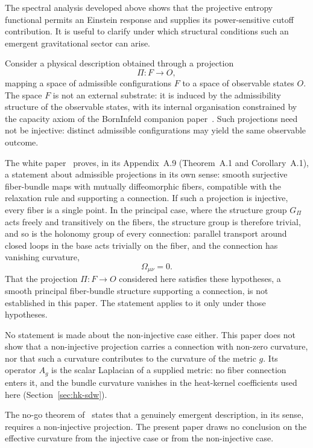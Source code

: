 \documentclass[pdflatex,sn-mathphys-num]{sn-jnl} %
\theoremstyle{remark}
\theoremstyle{plain}
\begin{document}
    The spectral analysis developed above shows that the projective entropy functional permits an Einstein response
    and supplies its power-sensitive cutoff contribution.
    It is useful to clarify under which structural conditions such an emergent
    gravitational sector can arise.

    Consider a physical description obtained through a projection
    \[
      \Pi : F \rightarrow O ,
    \]
    mapping a space of admissible configurations $F$ to a space of observable
    states $O$.
    The space $F$ is not an external substrate: it is induced by the admissibility
    structure of the observable states, with its internal organisation constrained
    by the capacity axiom of the Born\textendash Infeld companion paper~\cite{Beau2026c}.
    Such projections need not be injective: distinct admissible configurations may
    yield the same observable outcome.

    The white paper~\cite{Cosmochrony} proves, in its Appendix~A.9 (Theorem~A.1 and Corollary~A.1), a statement
    about admissible projections in its own sense: smooth surjective fiber-bundle maps with mutually
    diffeomorphic fibers, compatible with the relaxation rule and supporting a connection.
    If such a projection is injective, every fiber is a single point.
    In the principal case, where the structure group $G_\Pi$ acts freely and transitively on the fibers, the
    structure group is therefore trivial, and so is the holonomy group of every connection: parallel transport
    around closed loops in the base acts trivially on the fiber, and the connection has vanishing curvature,
    \[
      \Omega_{\mu\nu} = 0 .
    \]
    That the projection $\Pi : F \rightarrow O$ considered here satisfies these hypotheses, a smooth principal
    fiber-bundle structure supporting a connection, is not established in this paper.
    The statement applies to it only under those hypotheses.

    No statement is made about the non-injective case either.
    This paper does not show that a non-injective projection carries a connection with non-zero curvature, nor that
    such a curvature contributes to the curvature of the metric $g$.
    Its operator $A_g$ is the scalar Laplacian of a supplied metric: no fiber connection enters it, and the bundle
    curvature vanishes in the heat-kernel coefficients used here (Section~\ref{sec:hk-sdw}).

    The no-go theorem of~\cite{Beau2026l} states that a genuinely emergent description, in its sense, requires a
    non-injective projection.
    The present paper draws no conclusion on the effective curvature from the injective case or from the
    non-injective case.
\end{document}

